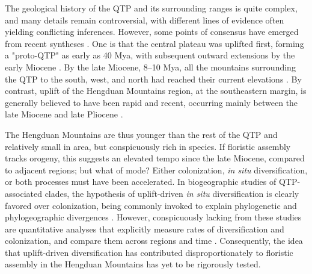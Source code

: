 The geological history of the QTP and its surrounding ranges is quite complex, and many details remain controversial, with different lines of evidence often yielding conflicting inferences. However, some points of consensus have emerged from recent syntheses \citep{WangC2014,Favre2015,Deng2015,Renner2016}. One is that the central plateau was uplifted first, forming a "proto-QTP" as early as 40 Mya, with subsequent outward extensions by the early Miocene \citep{Rowley2006,WangC2014}. By the late Miocene, 8--10 Mya, all the mountains surrounding the QTP to the south, west, and north had reached their current elevations \citep{Spicer2003,Fang2005,WangY2012,Deng2015}. By contrast, uplift of the Hengduan Mountains region, at the southeastern margin, is generally believed to have been rapid and recent, occurring mainly between the late Miocene and late Pliocene \citep{kirby2002,clark2005,WangE2012,Wang2014,Meng2016,SunB2011}.%

The Hengduan Mountains are thus younger than the rest of the QTP and relatively small in area, but conspicuously rich in species. If floristic assembly tracks orogeny, this suggests an elevated tempo since the late Miocene, compared to adjacent regions; but what of mode? Either colonization, \textit{in situ} diversification, or both processes must have been accelerated. In biogeographic studies of QTP-associated clades, the hypothesis of uplift-driven \textit{in situ} diversification is clearly favored over colonization, being commonly invoked to explain phylogenetic and phylogeographic divergences \citep[e.g.,][]{LiuJ2006,WangY2009,ZhangJ2014,GaoY2013}. However, conspicuously lacking from these studies are quantitative analyses that explicitly measure rates of diversification and colonization, and compare them across regions and time \citep{Wen2014,Favre2015}. Consequently, the idea that uplift-driven diversification has contributed disproportionately to floristic assembly in the Hengduan Mountains has yet to be rigorously tested.




